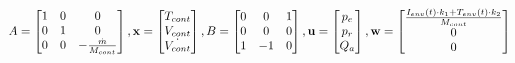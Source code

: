 \documentclass[a4paper,12pt,twoside,openright]{book}
\begin{document}
\hbox{
$A = 
\begin{bmatrix}
  1 & 0 & 0\\
  0 & 1 & 0\\
  0 & 0 & -\frac{\dot{m}}{M_{cont}}
\end{bmatrix},
\mathbf{x} =
\begin{bmatrix}
  T_{cont} \\
  V_{cont}\\
  \dot{V_{cont}}
\end{bmatrix},
B = 
\begin{bmatrix}
  0 & 0 & 1\\
  0 & 0 & 0\\
  1 & -1 & 0\\
\end{bmatrix},
\mathbf{u} =
\begin{bmatrix}
  p_{e}\\
  p_{r}\\
  Q_{a}\\
\end{bmatrix},
\mathbf{w} =
\begin{bmatrix}
  \frac{I_{env}(t)\cdot{k_1}+T_{env}(t)\cdot{k_2}}{M_{cont}}\\
  0\\
  0\\
\end{bmatrix}
$
}




%


\end{document}
